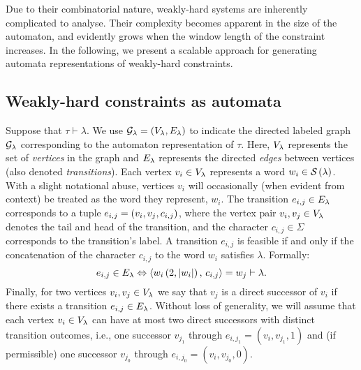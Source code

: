 Due to their combinatorial nature, weakly-hard systems are inherently complicated to analyse.
Their complexity becomes apparent in the size of the automaton, and evidently grows when the window length of the constraint increases.
In the following, we present a scalable approach for generating automata representations of weakly-hard constraints.

\subsection{Weakly-hard constraints as automata}%
\label{sec:tool:notation}%
%
Suppose that $\tau \vdash \lambda$.
We use $\mathcal{G}_{\lambda} = (V_{\lambda}, E_{\lambda})$ to indicate the directed labeled graph $\mathcal{G}_{\lambda}$ corresponding to the automaton representation of $\tau$.
Here, $V_{\lambda}$ represents the set of \emph{vertices} in the graph and $E_{\lambda}$ represents the directed \emph{edges} between vertices (also denoted \emph{transitions}).
Each vertex $v_i \in V_{\lambda}$ represents a word $w_i \in \mathcal{S}_{}\left( \lambda \right)$.
With a slight notational abuse, vertices $v_i$ will occasionally (when evident from context) be treated as the word they represent, $w_i$.
The transition $e_{i,j} \in E_{\lambda}$ corresponds to a tuple $e_{i,j} = \left( v_i, v_j, c_{i, j} \right)$, where the vertex pair $v_i, v_j \in V_{\lambda}$ denotes the tail and head of the transition, and the character $c_{i,j} \in \Sigma$ corresponds to the transition's label.
A transition $e_{i, j}$ is feasible if and only if the concatenation of the character $c_{i,j}$ to the word $w_i$ satisfies $\lambda$. Formally: 
\begin{equation*}
    e_{i, j} \in E_{\lambda} \Leftrightarrow \left\langle w_i\left( 2,\left|w_i\right| \right),\, c_{i,j} \right\rangle = w_j \vdash \lambda.
\end{equation*}
Finally, for two vertices $v_i, v_j \in V_{\lambda}$ we say that $v_j$ is a direct successor of $v_i$ if there exists a transition $e_{i,j} \in E_{\lambda}$.
Without loss of generality, we will assume that each vertex $v_i \in V_{\lambda}$ can have at most two direct successors with distinct transition outcomes, i.e., one successor $v_{j_1}$ through $e_{i, j_1} = \left( v_i, v_{j_1}, 1 \right)$ and (if permissible) one successor $v_{j_0}$ through $e_{i, j_0} = \left( v_i, v_{j_0}, 0 \right)$.

